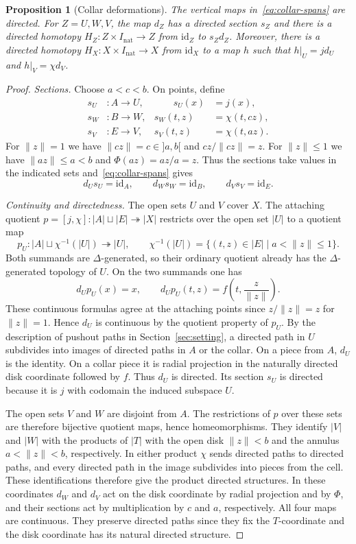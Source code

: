 \documentclass[12pt,a4paper]{amsart}
\newtheorem*{collarproposition}{Proposition}
\theoremstyle{definition}
\renewcommand{\leq}{\leqslant}
\newcommand{\rev}[1]{#1_{\mathrm{nat}}}
\newcommand{\Iv}{\rev{I}}
\newcommand{\abs}[1]{\lvert#1\rvert}
\begin{document}
\begin{collarproposition}[Collar deformations]
The vertical maps in~\eqref{eq:collar-spans} are directed. For $Z=U,W,V$, the map $d_Z$ has a directed section $s_Z$ and there is a directed homotopy $H_Z\colon Z\times\Iv\to Z$ from $\mathrm{id}_Z$ to $s_Zd_Z$. Moreover, there is a directed homotopy $H_X\colon X\times\Iv\to X$ from $\mathrm{id}_X$ to a map $h$ such that $h|_U=jd_U$ and $h|_V=\chi d_V$.
\end{collarproposition}
\begin{proof}
\emph{Sections.} Choose $a<c<b$. On points, define
\[
\begin{alignedat}{2}
 s_U&\colon A\longrightarrow U, &\qquad s_U(x)&=j(x),\\
 s_W&\colon B\longrightarrow W, & s_W(t,z)&=\chi(t,cz),\\
 s_V&\colon E\longrightarrow V, & s_V(t,z)&=\chi(t,az).
\end{alignedat}
\]
For $\|z\|=1$ we have $\|cz\|=c\in{]}a,b[$ and $cz/\|cz\|=z$. For $\|z\|\leq1$ we have $\|az\|\leq a<b$ and $\Phi(az)=az/a=z$. Thus the sections take values in the indicated sets and~\eqref{eq:collar-spans} gives
\[
 d_U s_U=\mathrm{id}_A,\qquad d_W s_W=\mathrm{id}_B,\qquad d_V s_V=\mathrm{id}_E .
\]

\emph{Continuity and directedness.} The open sets $U$ and $V$ cover $X$. The attaching quotient $p=[j,\chi]\colon\abs A\sqcup\abs E\twoheadrightarrow\abs X$ restricts over the open set $\abs U$ to a quotient map
\[
 p_U\colon\abs A\sqcup\chi^{-1}(\abs U)\twoheadrightarrow\abs U,\qquad
 \chi^{-1}(\abs U)=\{(t,z)\in\abs E\mid a<\|z\|\leq1\}.
\]
Both summands are $\Delta$-generated, so their ordinary quotient already has the $\Delta$-generated topology of $U$. On the two summands one has
\[
 d_U p_U(x)=x,\qquad d_U p_U(t,z)=f\!\left(t,\frac{z}{\|z\|}\right).
\]
These continuous formulas agree at the attaching points since $z/\|z\|=z$ for $\|z\|=1$. Hence $d_U$ is continuous by the quotient property of $p_U$. By the description of pushout paths in Section~\ref{sec:setting}, a directed path in $U$ subdivides into images of directed paths in $A$ or the collar. On a piece from $A$, $d_U$ is the identity. On a collar piece it is radial projection in the naturally directed disk coordinate followed by $f$. Thus $d_U$ is directed. Its section $s_U$ is directed because it is $j$ with codomain the induced subspace $U$.

The open sets $V$ and $W$ are disjoint from $A$. The restrictions of $p$ over these sets are therefore bijective quotient maps, hence homeomorphisms. They identify $\abs V$ and $\abs W$ with the products of $\abs T$ with the open disk $\|z\|<b$ and the annulus $a<\|z\|<b$, respectively. In either product $\chi$ sends directed paths to directed paths, and every directed path in the image subdivides into pieces from the cell. These identifications therefore give the product directed structures. In these coordinates $d_W$ and $d_V$ act on the disk coordinate by radial projection and by $\Phi$, and their sections act by multiplication by $c$ and $a$, respectively. All four maps are continuous. They preserve directed paths since they fix the $T$-coordinate and the disk coordinate has its natural directed structure.


\end{proof}
\end{document}
